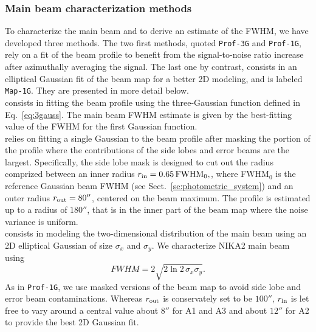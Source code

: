 \subsubsection{Main beam characterization methods}
\label{se:mainbeam_methods}
To characterize the main beam and to derive an estimate of the FWHM, we
have developed three methods. The two first methods, quoted
{\tt Prof-3G} and {\tt Prof-1G}, rely on a fit of the beam profile to
benefit from the signal-to-noise ratio increase after azimuthally
averaging the signal. The last one by contrast,
consists in an elliptical Gaussian fit of the beam map for a better
2D modeling, and is labeled {\tt Map-1G}. They are presented in more
detail below. \\

 consists in fitting the beam profile using the
three-Gaussian function defined in Eq.~\ref{eq:3gauss}.
 The main beam FWHM estimate is given by the best-fitting value
of the FWHM for the first Gaussian function.\\

 relies on fitting a single Gaussian to the beam
profile after masking the portion of the profile where the
contributions of the side lobes and error beams are the
largest. Specifically, the side lobe mask is designed to cut out the
radius comprized between an inner radius
$r_{\rm{in}} = 0.65\, \mathrm{FWHM}_0,$, where FWHM$_0$ is the
reference Gaussian beam FWHM (see Sect.~\ref{se:photometric_system})
and an outer radius $r_{\rm{out}} = 80''$, centered on the beam
maximum.
The profile is estimated up to a radius of
$180''$, that is in the inner part of the beam map where the noise
variance is uniform.\\

 consists in modeling the two-dimensional distribution of
the main beam using an 2D elliptical Gaussian of size $\sigma_x$ and
$\sigma_y$. We characterize NIKA2 main beam using
\begin{equation}
  FWHM = 2 \sqrt{2\ln {2}\, \sigma_x\sigma_y}.
\end{equation}
As in {\tt Prof-1G}, we use masked versions of the
beam map to avoid side lobe and error beam contaminations. 
Whereas $r_{\rm{out}}$ is conservately set to be $100''$,
$r_{\rm{in}}$ is let free to vary around a central value about $8''$
for A1 and A3 and about $12''$ for A2 to provide the best 2D Gaussian
fit.

